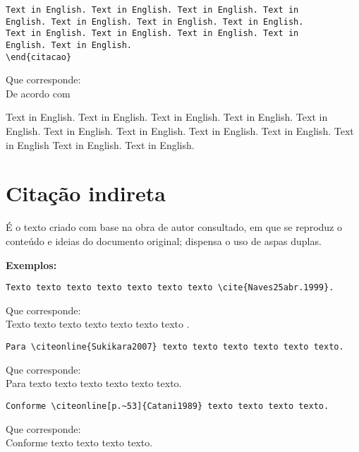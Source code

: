 \begin{alineas}
\begin{verbatim}
Text in English. Text in English. Text in English. Text in
English. Text in English. Text in English. Text in English. 
Text in English. Text in English. Text in English. Text in
English. Text in English.
\end{citacao}
\end{verbatim}
Que corresponde: \\
 De acordo com 
\begin{citacao}[english]
	Text in English. Text in English. Text in English. Text in English. Text in English. Text in English. Text in English. Text in English. Text in English. Text in English Text in English. Text in English.
\end{citacao}

\end{alineas}

\section{Citação indireta}

É o texto criado com base na obra de autor consultado, em que se reproduz o conteúdo e ideias do documento original; dispensa o uso de aspas duplas.

\textbf{Exemplos:}\\
\begin{alineas}
\item
\begin{verbatim}
Texto texto texto texto texto texto texto \cite{Naves25abr.1999}.
\end{verbatim}
Que corresponde: \\
Texto texto texto texto texto texto texto \cite{Naves25abr.1999}.
\item
\begin{verbatim}
Para \citeonline{Sukikara2007} texto texto texto texto texto texto.
\end{verbatim}
Que corresponde: \\
Para  texto texto texto texto texto texto.
\item
\begin{verbatim}
Conforme \citeonline[p.~53]{Catani1989} texto texto texto texto.
\end{verbatim}
Que corresponde: \\
Conforme  texto texto texto texto.\\
\end{alineas} 


